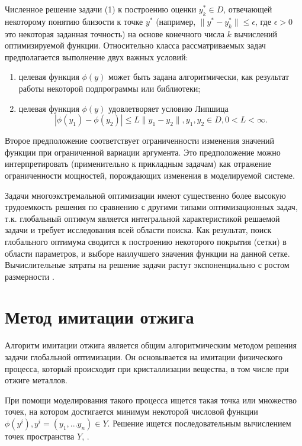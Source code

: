 \documentclass[11pt, oneside, a4paper]{article}
\begin{document}
Численное решение задачи (1) к построению оценки $y_k^* \in D$, отвечающей некоторому понятию близости к точке $y^*$ (например, $\parallel y^*-y_k^* \parallel \leq \epsilon$, где $\epsilon>0$ это некоторая заданная точность) на основе конечного числа $k$ вычислений оптимизируемой функции.
Относительно класса рассматриваемых задач предполагается выполнение двух важных условий:
\begin{enumerate}
\item целевая функция $\phi(y)$ может быть задана алгоритмически, как результат работы некоторой подпрограммы или библиотеки;

\item целевая функция $\phi(y)$ удовлетворяет условию Липшица
\begin{equation}
|\phi(y_1)-\phi(y_2)|\leq L\parallel y_1-y_2 \parallel
,y_1,y_2 \in D, 0<L< \infty.
\end{equation}
\end{enumerate}
Второе предположение соответствует ограниченности изменения значений функции при ограниченной вариации аргумента. Это предположение можно интерпретировать (применительно к прикладным задачам) как отражение ограниченности мощностей, порождающих изменения в моделируемой системе.

Задачи многоэкстремальной оптимизации имеют существенно более высокую трудоемкость решения по сравнению с другими типами оптимизационных задач, т.к. глобальный оптимум является интегральной характеристикой решаемой задачи и требует исследования всей области поиска. Как результат, поиск глобального оптимума сводится к построению некоторого покрытия (сетки) в области параметров, и выборе наилучшего значения функции на данной сетке. Вычислительные затраты на решение задачи растут экспоненциально с ростом размерности \cite{fio_bib7}.


\section{Метод имитации отжига}

Алгоритм имитации отжига является общим алгоритмическим методом решения задачи глобальной оптимизации. Он основывается на имитации физического процесса, который происходит при кристаллизации вещества, в том числе при отжиге металлов.

При помощи моделирования такого процесса ищется такая точка или множество точек, на котором достигается минимум некоторой числовой функции $\phi(y^i),y^i=(y_1,...y_n)\in Y$. Решение ищется последовательным вычислением точек пространства $Y$\cite{fio_bib16}, \cite{fio_bib20}. 
\end{document}
